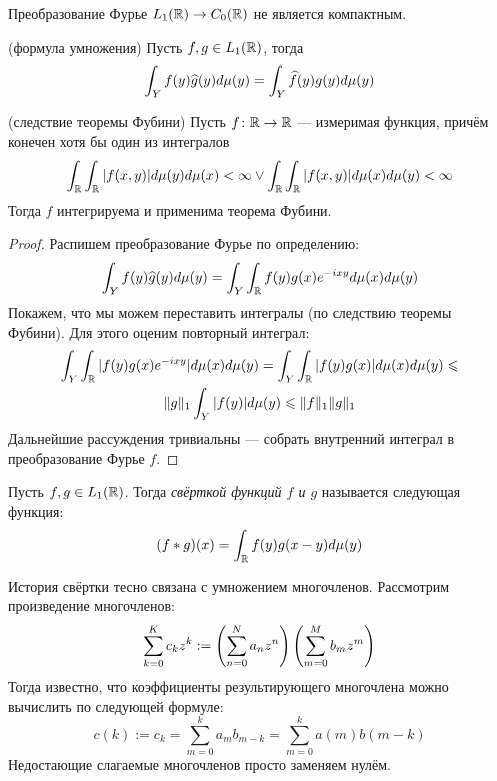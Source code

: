 \begin{exercise}
	Преобразование Фурье $L_1(\mathbb{R}) \to C_0(\mathbb{R})$ не является компактным.
\end{exercise}

\begin{proposition} (формула умножения)
	Пусть $f, g \in L_1(\mathbb{R})$, тогда
	\[
		\int_Y f(y)\widehat{g}(y)d\mu(y) = \int_Y \widehat{f}(y)g(y)d\mu(y)
	\]
\end{proposition}

\begin{reminder} (следствие теоремы Фубини)
	Пусть $f \colon \mathbb{R} \to \mathbb{R}$ --- измеримая функция, причём конечен хотя бы один из интегралов
	\[
		\int_{\mathbb{R}} \int_{\mathbb{R}} |f(x, y)|d\mu(y)d\mu(x) < \infty \vee \int_{\mathbb{R}} \int_{\mathbb{R}} |f(x, y)|d\mu(x)d\mu(y) < \infty
	\]
	Тогда $f$ интегрируема и применима теорема Фубини.
\end{reminder}

\begin{proof}
	Распишем преобразование Фурье по определению:
	\[
		\int_Y f(y)\widehat{g}(y)d\mu(y) = \int_Y \int_{\mathbb{R}} f(y)g(x)e^{-ixy}d\mu(x)d\mu(y)
	\]
	Покажем, что мы можем переставить интегралы (по следствию теоремы Фубини). Для этого оценим повторный интеграл:
	\begin{multline*}
		\int_Y \int_{\mathbb{R}} |f(y)g(x)e^{-ixy}|d\mu(x)d\mu(y) = \int_Y \int_{\mathbb{R}} |f(y)g(x)|d\mu(x)d\mu(y) \leqslant
		\\
		\|g\|_1\int_Y |f(y)|d\mu(y) \leqslant \|f\|_1\|g\|_1
	\end{multline*}
	Дальнейшие рассуждения тривиальны --- собрать внутренний интеграл в преобразование Фурье $f$.
\end{proof}

\begin{definition}
	Пусть $f, g \in L_1(\mathbb{R})$. Тогда \textit{свёрткой функций $f$ и $g$} называется следующая функция:
	\[
		(f * g)(x) = \int_{\mathbb{R}} f(y)g(x - y)d\mu(y)
	\]
\end{definition}

\begin{note}
	История свёртки тесно связана с умножением многочленов. Рассмотрим произведение многочленов:
	\[
		\sum_{k = 0}^K c_kz^k := \left(\sum_{n = 0}^N a_nz^n\right)\left(\sum_{m = 0}^M b_mz^m\right)
	\]
	Тогда известно, что коэффициенты результирующего многочлена можно вычислить по следующей формуле:
	\[
		c(k) := c_k = \sum_{m = 0}^k a_mb_{m - k} = \sum_{m = 0}^k a(m)b(m - k)
	\]
	Недостающие слагаемые многочленов просто заменяем нулём.
\end{note}

